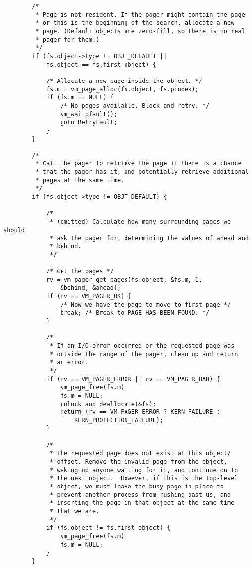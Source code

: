 \documentclass[shortabstract, english]{iithesis}
\newenvironment{code}{}{}
\begin{document}
\begin{code}
\begin{verbatim}
        /*
         * Page is not resident. If the pager might contain the page
         * or this is the beginning of the search, allocate a new
         * page. (Default objects are zero-fill, so there is no real
         * pager for them.)
         */
        if (fs.object->type != OBJT_DEFAULT ||
            fs.object == fs.first_object) {

            /* Allocate a new page inside the object. */
            fs.m = vm_page_alloc(fs.object, fs.pindex);
            if (fs.m == NULL) {
                /* No pages available. Block and retry. */
                vm_waitpfault();
                goto RetryFault;
            }
        }

        /*
         * Call the pager to retrieve the page if there is a chance
         * that the pager has it, and potentially retrieve additional
         * pages at the same time.
         */
        if (fs.object->type != OBJT_DEFAULT) {

            /*
             * (omitted) Calculate how many surrounding pages we should
             * ask the pager for, determining the values of ahead and
             * behind.
             */

            /* Get the pages */
            rv = vm_pager_get_pages(fs.object, &fs.m, 1,
                &behind, &ahead);
            if (rv == VM_PAGER_OK) {
                /* Now we have the page to move to first_page */
                break; /* Break to PAGE HAS BEEN FOUND. */
            }

            /*
             * If an I/O error occurred or the requested page was
             * outside the range of the pager, clean up and return
             * an error.
             */
            if (rv == VM_PAGER_ERROR || rv == VM_PAGER_BAD) {
                vm_page_free(fs.m);
                fs.m = NULL;
                unlock_and_deallocate(&fs);
                return (rv == VM_PAGER_ERROR ? KERN_FAILURE :
                    KERN_PROTECTION_FAILURE);
            }

            /*
             * The requested page does not exist at this object/
             * offset. Remove the invalid page from the object,
             * waking up anyone waiting for it, and continue on to
             * the next object.  However, if this is the top-level
             * object, we must leave the busy page in place to
             * prevent another process from rushing past us, and
             * inserting the page in that object at the same time
             * that we are.
             */
            if (fs.object != fs.first_object) {
                vm_page_free(fs.m);
                fs.m = NULL;
            }
        }


\end{verbatim}
\end{code}
\end{document}

